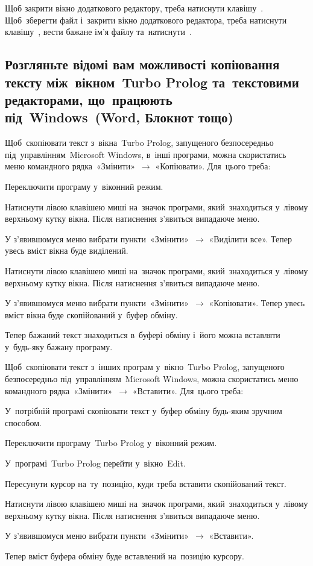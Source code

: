 \documentclass[
	a4paper,
	oneside,
	BCOR = 10mm,
	DIV = 12,
	12pt,
	headings = normal,
]{scrartcl}
\newcommand{\Mytextrightarrow}{$\rightarrow$}
\begin{document}
			Щоб закрити вікно додаткового редактору, треба натиснути клавішу~\keys{\esc}. Щоб~зберегти файл і~закрити вікно додаткового редактора, треба натиснути клавішу~, вести бажане ім'я файлу та~натиснути~\keys{\return}.

		\subsection{Розгляньте відомі вам можливості копіювання тексту між~вікном~\textenglish{Turbo Prolog} та~текстовими редакторами, що~працюють під~\textenglish{Windows}~(\textenglish{Word}, Блокнот тощо)}
			Щоб~скопіювати текст з~вікна~\textenglish{Turbo Prolog}, запущеного безпосередньо під~управлінням~\textenglish{Microsoft Windows}, в~інші програми, можна скористатись меню командного рядка~«Змінити»~\Mytextrightarrow{ } «Копіювати». Для~цього треба:
			\begin{steps}
				\item Переключити програму у~віконний режим. 
				\item Натиснути лівою клавішею миші на~значок програми, який~знаходиться у~лівому верхньому кутку вікна. Після натиснення з'я\-ви\-ться випадаюче меню.
				\item У з'явившомуся меню вибрати пункти~«Змінити»~\Mytextrightarrow{ } «Виділити все». Тепер увесь вміст вікна буде виділений. 
				\item Натиснути лівою клавішею миші на~значок програми, який~знаходиться у~лівому верхньому кутку вікна. Після натиснення з'я\-ви\-ться випадаюче меню.
				\item У з'явившомуся меню вибрати пункти~«Змінити»~\Mytextrightarrow{ } «Копіювати». Тепер увесь вміст вікна буде скопійований у~буфер обміну. 
			\end{steps}
			Тепер бажаний текст знаходиться в~буфері обміну і~його можна вставляти у~будь-яку бажану програму. 

			Щоб~скопіювати текст з~інших програм у~вікно~\textenglish{Turbo Prolog}, запущеного безпосередньо під~управлінням~\textenglish{Microsoft Windows}, можна скористатись меню командного рядка~«Змінити»~\Mytextrightarrow{ } «Вставити». Для~цього треба:
			\begin{steps}
				\item У~потрібній програмі скопіювати текст у~буфер обміну будь-яким зручним способом. 
				\item Переключити програму~\textenglish{Turbo Prolog} у~віконний режим. 
				\item У~програмі~\textenglish{Turbo Prolog} перейти у~вікно~\textenglish{Edit}.
				\item Пересунути курсор на~ту~позицію, куди треба вставити скопійований текст. 
				\item Натиснути лівою клавішею миші на~значок програми, який~знаходиться у~лівому верхньому кутку вікна. Після натиснення з'я\-ви\-ться випадаюче меню.
				\item У з'явившомуся меню вибрати пункти~«Змінити»~\Mytextrightarrow{ } «Вставити». 
			\end{steps}
			Тепер вміст буфера обміну буде вставлений на~позицію курсору. 
\end{document}
